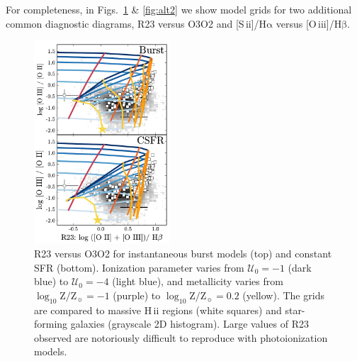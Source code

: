 \documentclass[linenumbers, tighten, trackchanges]{aastex61}%
\newcommand{\logten}{\ensuremath{\log_{10}}}
\newcommand{\sii}{[S\,{\sc ii}]\xspace}
\newcommand{\oiii}{[O\,{\sc iii}]\xspace}
\newcommand{\ha}{\ensuremath{\mathrm{H\alpha}}}
\newcommand{\hb}{\ensuremath{\mathrm{H\beta}}}
\newcommand{\hii}{H\,{\sc ii}\xspace}
\newcommand{\logZeq}[1]{\ensuremath{\logten \mathrm{Z}/\mathrm{Z}_{\sun} = #1}}
\newcommand{\U}{\ensuremath{\mathcal{U}_{0}}}
\begin{document}
For completeness, in Figs.~\ref{fig:alt1} \& \ref{fig:alt2} we show model grids for two additional common diagnostic diagrams, R23 versus O3O2 and \sii{}/\ha{} versus \oiii{}/\hb{}.
\begin{figure}[!htbp]
  \begin{centering}
    \includegraphics[width=0.45\textwidth]{f21.pdf}
    \caption{R23 versus O3O2 for instantaneous burst models (top) and constant SFR (bottom). Ionization parameter varies from $\U=-1$ (dark blue) to $\U=-4$ (light blue), and metallicity varies from \logZeq{-1} (purple) to \logZeq{0.2} (yellow). The grids are compared to massive \hii regions (white squares) and star-forming galaxies (grayscale 2D histogram). Large values of R23 observed are notoriously difficult to reproduce with photoionization models.}
    \label{fig:alt1}
  \end{centering}
\end{figure}
\end{document}
